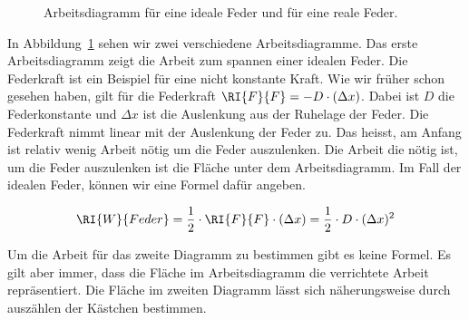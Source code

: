 \documentclass[12pt,a4paper,twoside]{article}
\def\dir{./Aufgaben_Mechanik/}
\newcommand{\Einbinden}[1]{}
\begin{document}
\begin{figure}[h!]
\begin{center}

\end{center}
\caption{\label{fig:arbeitsdiagramm} Arbeitsdiagramm für eine ideale Feder und für eine reale Feder.
}
\end{figure}

In Abbildung~\ref{fig:arbeitsdiagramm} sehen wir zwei verschiedene Arbeitsdiagramme. 
Das erste Arbeitsdiagramm zeigt die Arbeit zum spannen einer idealen Feder.
Die Federkraft ist ein Beispiel für eine nicht konstante Kraft. Wie wir früher schon
gesehen haben, gilt für die Federkraft $\RI{F}{F} = -D\cdot (\Delta x)$. Dabei ist $D$ die Federkonstante
und $\Delta x$ ist die Auslenkung aus der Ruhelage der Feder.
Die Federkraft nimmt linear mit der Auslenkung der Feder zu. Das heisst, am Anfang ist relativ wenig
Arbeit nötig um die Feder auszulenken. Die Arbeit die nötig ist, um die Feder auszulenken ist
die Fläche unter dem Arbeitsdiagramm. Im Fall der idealen Feder, können wir eine Formel dafür angeben.


\begin{eqnarray*}
	\RI{W}{Feder}= \frac{1}{2}\cdot\RI{F}{F}\cdot(\Delta x)=\frac{1}{2}\cdot D\cdot(\Delta x)^2
\end{eqnarray*}

Um die Arbeit für das zweite Diagramm zu bestimmen gibt es keine Formel. Es gilt aber immer, dass die Fläche
im Arbeitsdiagramm die verrichtete Arbeit repräsentiert. Die Fläche im zweiten Diagramm lässt sich näherungsweise
durch auszählen der Kästchen bestimmen.

%

\Einbinden{\dir/arbeit_feder01.tex}

\newpage
{}
\end{document}
